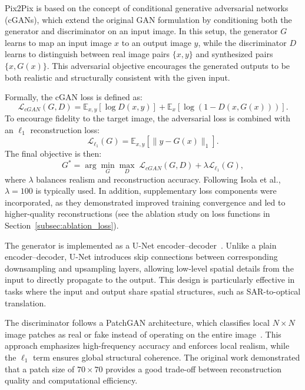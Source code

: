 Pix2Pix is based on the concept of conditional generative adversarial networks (cGANs), which extend the original GAN formulation by conditioning both the generator and discriminator on an input image. In this setup, the generator $G$ learns to map an input image $x$ to an output image $y$, while the discriminator $D$ learns to distinguish between real image pairs $\{x, y\}$ and synthesized pairs $\{x, G(x)\}$. This adversarial objective encourages the generated outputs to be both realistic and structurally consistent with the given input.


Formally, the cGAN loss is defined as:
\begin{equation}
    \mathcal{L}_{cGAN}(G,D) = \mathbb{E}_{x,y}[\log D(x,y)] + \mathbb{E}_{x}[\log(1 - D(x,G(x)))].
\end{equation}
To encourage fidelity to the target image, the adversarial loss is combined with an $\ell_{1}$ reconstruction loss:
\begin{equation}
    \mathcal{L}_{\ell_1}(G) = \mathbb{E}_{x,y}[\|y - G(x)\|_1].
\end{equation}
The final objective is then:
\begin{equation}
    G^* = \arg \min_G \max_D \; \mathcal{L}_{cGAN}(G,D) + \lambda \mathcal{L}_{\ell_1}(G),
\end{equation}
where $\lambda$ balances realism and reconstruction accuracy. Following Isola et al., $\lambda = 100$ is typically used. In addition, supplementary loss components were incorporated, as they demonstrated improved training convergence and led to higher-quality reconstructions (see the ablation study on loss functions in Section~\ref{subsec:ablation_loss}).

The generator is implemented as a U-Net encoder–decoder~\cite{U_net_2015}. Unlike a plain encoder–decoder, U-Net introduces skip connections between corresponding downsampling and upsampling layers, allowing low-level spatial details from the input to directly propagate to the output. This design is particularly effective in tasks where the input and output share spatial structures, such as SAR-to-optical translation.

The discriminator follows a PatchGAN architecture, which classifies local $N \times N$ image patches as real or fake instead of operating on the entire image~\cite{pix2pix_2018}. This approach emphasizes high-frequency accuracy and enforces local realism, while the $\ell_1$ term ensures global structural coherence. The original work demonstrated that a patch size of $70 \times 70$ provides a good trade-off between reconstruction quality and computational efficiency.

